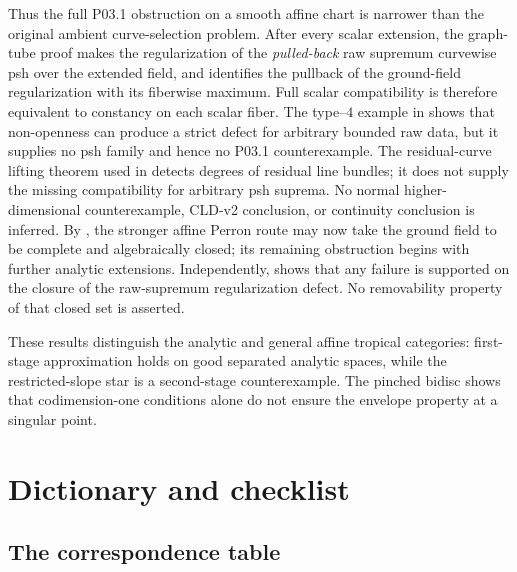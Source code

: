 Thus the full P03.1 obstruction on a smooth affine chart is narrower than
the original ambient curve-selection problem.  After every scalar
extension, the graph-tube proof makes the regularization of the
\emph{pulled-back} raw supremum curvewise psh over the extended field, and
 identifies the pullback of the
ground-field regularization with its fiberwise maximum.  Full scalar
compatibility is therefore equivalent to constancy on each scalar fiber.
The type--$4$ example in
 shows that non-openness can
produce a strict defect for arbitrary bounded raw data, but it supplies no
psh family and hence no P03.1 counterexample.  The residual-curve lifting
theorem used in
 detects degrees of residual line bundles; it
does not supply the missing compatibility for arbitrary psh suprema.  No
normal higher-dimensional counterexample, CLD-v2 conclusion, or continuity
conclusion is inferred.  By
, the stronger affine
Perron route may now take the ground field to be complete and algebraically
closed; its remaining obstruction begins with further analytic extensions.
Independently,  shows that any
failure is supported on the closure of the raw-supremum regularization
defect.  No removability property of that closed set is asserted.







These results distinguish the analytic and general affine
tropical categories: first-stage approximation holds on good separated
analytic spaces, while the restricted-slope star is a second-stage
counterexample.  The pinched bidisc shows that codimension-one conditions
alone do not ensure the envelope property at a singular point.

\section{Dictionary and checklist}
\label{sec:ch15-dictionary}

\subsection{The correspondence table}

